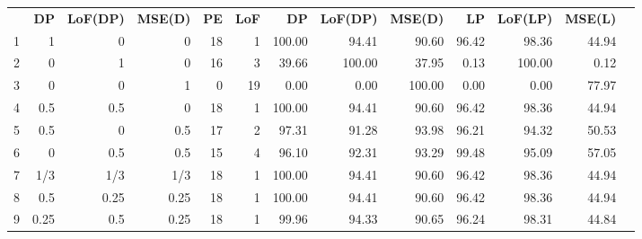 \begin{table}[h]
{\begin{tabular}{rrrrrrrrrrrrr}
   & \textbf{DP}       & \textbf{LoF(DP)}    & \textbf{MSE(D)}   & \textbf{PE}        & \textbf{LoF}        & \textbf{DP}   & \textbf{LoF(DP)}   & \textbf{MSE(D)}  & \textbf{LP}       & \textbf{LoF(LP)}   & \textbf{MSE(L)}  \\
1 & 1    & 0    & 0    & \multicolumn{1}{|r}{18} & \multicolumn{1}{r|}{1}  & 100.00 & 94.41  & 90.60  & \multicolumn{1}{|r}{96.42} & 98.36  & 44.94 \\
2 & 0    & 1    & 0    & \multicolumn{1}{|r}{16} & \multicolumn{1}{r|}{3}  & 39.66  & 100.00 & 37.95  & \multicolumn{1}{|r}{0.13}  & 100.00 & 0.12  \\
3 & 0    & 0    & 1    & \multicolumn{1}{|r}{0}  & \multicolumn{1}{r|}{19} & 0.00   & 0.00   & 100.00 & \multicolumn{1}{|r}{0.00}  & 0.00   & 77.97 \\
4 & 0.5  & 0.5  & 0    & \multicolumn{1}{|r}{18} & \multicolumn{1}{r|}{1}  & 100.00 & 94.41  & 90.60  & \multicolumn{1}{|r}{96.42} & 98.36  & 44.94 \\
5 & 0.5  & 0    & 0.5  & \multicolumn{1}{|r}{17} & \multicolumn{1}{r|}{2}  & 97.31  & 91.28  & 93.98  & \multicolumn{1}{|r}{96.21} & 94.32  & 50.53 \\
6 & 0    & 0.5  & 0.5  & \multicolumn{1}{|r}{15} & \multicolumn{1}{r|}{4}  & 96.10  & 92.31  & 93.29  & \multicolumn{1}{|r}{99.48} & 95.09  & 57.05 \\
7 & 1/3  & 1/3  & 1/3  & \multicolumn{1}{|r}{18} & \multicolumn{1}{r|}{1}  & 100.00 & 94.41  & 90.60  & \multicolumn{1}{|r}{96.42} & 98.36  & 44.94 \\
8 & 0.5  & 0.25 & 0.25 & \multicolumn{1}{|r}{18} & \multicolumn{1}{r|}{1}  & 100.00 & 94.41  & 90.60  & \multicolumn{1}{|r}{96.42} & 98.36  & 44.94 \\
9 & 0.25 & 0.5  & 0.25 & \multicolumn{1}{|r}{18} & \multicolumn{1}{r|}{1}  & 99.96  & 94.33  & 90.65  & \multicolumn{1}{|r}{96.24} & 98.31  & 44.84 
\end{tabular}
}
\end{table}


